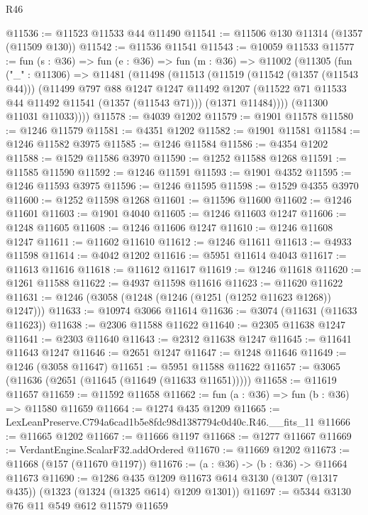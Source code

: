 \begin{lexlean}{R46}
\begin{coremodule}
@11536 := @11523 @11533 @44 @11490
@11541 := @11506 @130 @11314 (@1357 (@11509 @130))
@11542 := @11536 @11541
@11543 := @10059 @11533
@11577 := fun (s : @36) =>
  fun (e : @36) =>
  fun (m : @36) =>
  @11002
    (@11305
      (fun ("_" : @11306) =>
      @11481
        (@11498
          (@11513
            (@11519
              (@11542 (@1357 (@11543 @44)))
              (@11499
                @797
                @88
                @1247
                @1247
                @11492
                @1207
                (@11522 @71 @11533 @44 @11492 @11541 (@1357 (@11543 @71)))
                (@1371 @11484))))
          (@11300 @11031 @11033))))
@11578 := @4039 @1202
@11579 := @1901 @11578
@11580 := @1246 @11579
@11581 := @4351 @1202
@11582 := @1901 @11581
@11584 := @1246 @11582 @3975
@11585 := @1246 @11584
@11586 := @4354 @1202
@11588 := @1529 @11586 @3970
@11590 := @1252 @11588 @1268
@11591 := @11585 @11590
@11592 := @1246 @11591
@11593 := @1901 @4352
@11595 := @1246 @11593 @3975
@11596 := @1246 @11595
@11598 := @1529 @4355 @3970
@11600 := @1252 @11598 @1268
@11601 := @11596 @11600
@11602 := @1246 @11601
@11603 := @1901 @4040
@11605 := @1246 @11603 @1247
@11606 := @1248 @11605
@11608 := @1246 @11606 @1247
@11610 := @1246 @11608 @1247
@11611 := @11602 @11610
@11612 := @1246 @11611
@11613 := @4933 @11598
@11614 := @4042 @1202
@11616 := @5951 @11614 @4043
@11617 := @11613 @11616
@11618 := @11612 @11617
@11619 := @1246 @11618
@11620 := @1261 @11588
@11622 := @4937 @11598 @11616
@11623 := @11620 @11622
@11631 := @1246 (@3058 (@1248 (@1246 (@1251 (@1252 @11623 @1268)) @1247)))
@11633 := @10974 @3066 @11614
@11636 := @3074 (@11631 (@11633 @11623))
@11638 := @2306 @11588 @11622
@11640 := @2305 @11638 @1247
@11641 := @2303 @11640
@11643 := @2312 @11638 @1247
@11645 := @11641 @11643 @1247
@11646 := @2651 @1247
@11647 := @1248 @11646
@11649 := @1246 (@3058 @11647)
@11651 := @5951 @11588 @11622
@11657 := @3065 (@11636 (@2651 (@11645 (@11649 (@11633 @11651)))))
@11658 := @11619 @11657
@11659 := @11592 @11658
@11662 := fun (a : @36) => fun (b : @36) => @11580 @11659
@11664 := @1274 @435 @1209
@11665 := LexLeanPreserve.C794a6cad1b5e8fdc98d1387794c0d40c.R46.__fits_11
@11666 := @11665 @1202
@11667 := @11666 @1197
@11668 := @1277 @11667
@11669 := VerdantEngine.ScalarF32.addOrdered
@11670 := @11669 @1202
@11673 := @11668 (@157 (@11670 @1197))
@11676 := (a : @36) -> (b : @36) -> @11664 @11673
@11690 := @1286
    @435
    @1209
    @11673
    @614
    @3130
    (@1307 (@1317 @435))
    (@1323 (@1324 (@1325 @614) @1209 @1301))
@11697 := @5344 @3130 @76 @11 @549 @612 @11579 @11659

\end{coremodule}
\end{lexlean}
